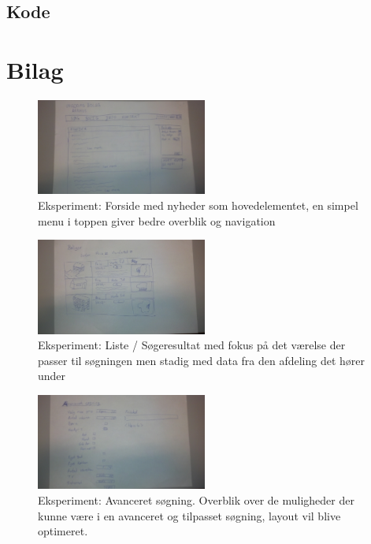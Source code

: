\documentclass[12pt, a4paper]{report}
\begin{document}
\section{Kode}

\chapter{Bilag}

\begin{figure}
\includegraphics[width=0.5\textwidth]{eksperiment_forside}
\caption{Eksperiment: Forside med nyheder som hovedelementet, en simpel menu i toppen giver bedre overblik og navigation}
\label{e_forside}
\end{figure}

\begin{figure}
\includegraphics[width=0.5\textwidth]{eksperiment_liste}
\caption{Eksperiment: Liste / Søgeresultat med fokus på det værelse der passer til søgningen men stadig med data fra den afdeling det hører under}
\label{e_liste}
\end{figure}

\begin{figure}
\includegraphics[width=0.5\textwidth]{eksperiment_soeg}
\caption{Eksperiment: Avanceret søgning. Overblik over de muligheder der kunne være i en avanceret og tilpasset søgning, layout vil blive optimeret.}
\label{e_soeg}
\end{figure}
\end{document}
